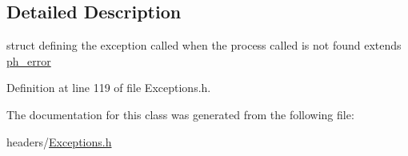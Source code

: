 \subsection{Detailed Description}
struct defining the exception called when the process called is not found extends \hyperlink{structph__error}{ph\+\_\+error} 

Definition at line 119 of file Exceptions.\+h.



The documentation for this class was generated from the following file\+:\begin{DoxyCompactItemize}
\item 
headers/\hyperlink{Exceptions_8h}{Exceptions.\+h}\end{DoxyCompactItemize}

